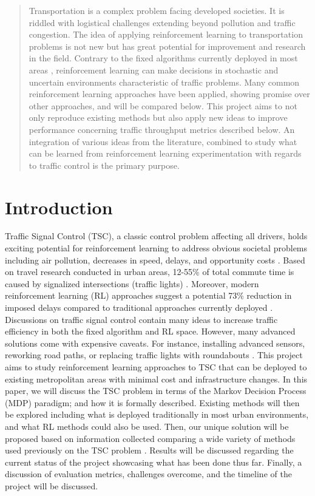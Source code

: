 \documentclass[letterpaper]{article} %
\begin{document}

\begin{abstract}
Transportation is a complex problem facing developed societies.
It is riddled with logistical challenges extending beyond pollution and traffic congestion.
The idea of applying reinforcement learning to transportation problems is not new but has great potential for improvement and research in the field.
Contrary to the fixed algorithms currently deployed in most areas \cite{Chaudhuri2021}, reinforcement learning can make decisions in stochastic and uncertain environments characteristic of traffic problems.
Many common reinforcement learning approaches have been applied, showing promise over other approaches, and will be compared below.
This project aims to not only reproduce existing methods but also apply new ideas to improve performance concerning traffic throughput metrics described below.
An integration of various ideas from the literature, combined to study what can be learned from reinforcement learning experimentation with regards to traffic control is the primary purpose.
\end{abstract}

\section{Introduction}
Traffic Signal Control (TSC), a classic control problem affecting all drivers, holds exciting potential for reinforcement learning to address obvious societal problems including air pollution, decreases in speed, delays, and opportunity costs \cite{Almeida2022MultiagentRL}.
Based on travel research conducted in urban areas, 12-55\% of total commute time is caused by signalized intersections (traffic lights) \cite{ault2021reinforcement}.
Moreover, modern reinforcement learning (RL) approaches suggest a potential 73\% reduction in imposed delays compared to traditional approaches currently deployed \cite{ault2021reinforcement}.
Discussions on traffic signal control contain many ideas to increase traffic efficiency in both the fixed algorithm and RL space.
However, many advanced solutions come with expensive caveats. For instance, installing advanced sensors, reworking road paths, or replacing traffic lights with roundabouts \cite{DBLP:journals/corr/abs-2004-04778}.
This project aims to study reinforcement learning approaches to TSC that can be deployed to existing metropolitan areas with minimal cost and infrastructure changes.
In this paper, we will discuss the TSC problem in terms of the Markov Decision Process (MDP) paradigm; and how it is formally described.
Existing methods will then be explored including what is deployed traditionally in most urban environments, and what RL methods could also be used.
Then, our unique solution will be proposed based on information collected comparing a wide variety of methods used previously on the TSC problem \cite{hafiz2020deep} \cite{ault2021reinforcement} \cite{Ghanadbashi2023}.
Results will be discussed regarding the current status of the project showcasing what has been done thus far.
Finally, a discussion of evaluation metrics, challenges overcome, and the timeline of the project will be discussed.
\end{document}
